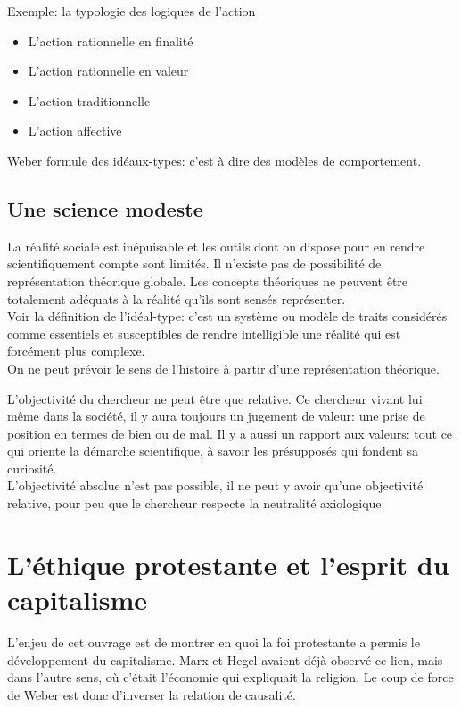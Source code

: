 \documentclass[10pt, a4paper, openany]{book}
\begin{document}
Exemple: la typologie des logiques de l'action
\begin{itemize}
\item L'action rationnelle en finalité
\item L'action rationnelle en valeur
\item L'action traditionnelle
\item L'action affective
\end{itemize}
Weber formule des idéaux-types: c'est à dire des modèles de comportement.


\subsection{Une science modeste}

La réalité sociale est inépuisable et les outils dont on dispose pour en rendre scientifiquement compte sont limités. Il n'existe pas de possibilité de représentation théorique globale. Les concepts théoriques ne peuvent être totalement adéquats à la réalité qu'ils sont sensés représenter. \\
Voir la définition de l'idéal-type: c'est un système ou modèle de traits considérés comme essentiels et susceptibles de rendre intelligible une réalité qui est forcément plus complexe. \\
On ne peut prévoir le sens de l'histoire à partir d'une représentation théorique.


L'objectivité du chercheur ne peut être que relative. Ce chercheur vivant lui même dans la société, il y aura toujours un jugement de valeur: une prise de position en termes de bien ou de mal. Il y a aussi un rapport aux valeurs: tout ce qui oriente la démarche scientifique, à savoir les présupposés qui fondent sa curiosité. \\
L'objectivité absolue n'est pas possible, il ne peut y avoir qu'une objectivité relative, pour peu que le chercheur respecte la neutralité axiologique.

\section{L'éthique protestante et l'esprit du capitalisme}

L'enjeu de cet ouvrage est de montrer en quoi la foi protestante a permis le développement du capitalisme. Marx et Hegel avaient déjà observé ce lien, mais dans l'autre sens, où c'était l'économie qui expliquait la religion. Le coup de force de Weber est donc d'inverser la relation de causalité.
\end{document}

